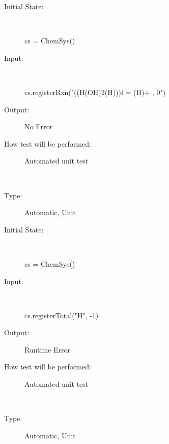 \documentclass[12pt, titlepage]{article}
\newcounter{testnum} %
\begin{document}
\begin{addmargin}[2em]{0em}
\begin{addmargin}[2em]{0em}
\begin{description}
\item[Initial State:] ~\newline

\begin{python}
cs = ChemSys()
\end{python}
					
\item[Input:] ~\newline

\begin{python}
cs.registerRxn("((H(OH)2(H)))l = (H)+ , 0") 
\end{python}
					
\item[Output:] No Error
					
\item[How test will be performed:] Automated unit test\\
\end{description}
\end{addmargin}


\\
\begin{addmargin}[2em]{0em}
\begin{description}
\item[Type:] Automatic, Unit
					
\item[Initial State:] ~\newline

\begin{python}
cs = ChemSys()
\end{python}
					
\item[Input:] ~\newline

\begin{python}
cs.registerTotal("H", -1) 
\end{python}
					
\item[Output:] Runtime Error
					
\item[How test will be performed:] Automated unit test\\
\end{description}
\end{addmargin}

\newpage
{}\\
\begin{addmargin}[2em]{0em}
\begin{description}
\item[Type:] Automatic, Unit
					

\end{description}
\end{addmargin}
\end{addmargin}
\end{document}
